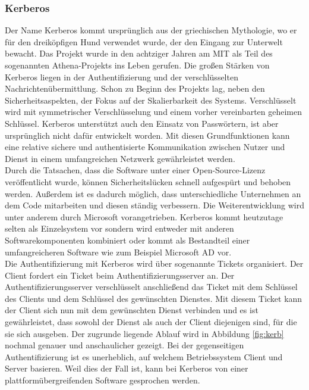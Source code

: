 \documentclass[
book,
a4paper,   
titlepage,  
halfparskip,
12pt        
]{scrartcl}
\begin{document}
\begin{onehalfspacing}
\subsubsection{Kerberos}
Der Name Kerberos kommt ursprünglich aus der griechischen Mythologie, wo er für den dreiköpfigen Hund verwendet wurde, der den Eingang zur Unterwelt bewacht. 
Das Projekt wurde in den achtziger Jahren am \ac{MIT} als Teil des sogenannten Athena-Projekts ins Leben gerufen\cite{athena}. Die großen Stärken von Kerberos liegen in der Authentifizierung und der verschlüsselten Nachrichtenübermittlung. Schon zu Beginn des Projekts lag, neben den Sicherheitsaspekten, der Fokus auf der Skalierbarkeit des Systems. 
Verschlüsselt wird mit symmetrischer Verschlüsselung und einem vorher vereinbarten geheimen Schlüssel. Kerberos unterstützt auch den Einsatz von Passwörtern, ist aber ursprünglich nicht dafür entwickelt worden. 
Mit diesen Grundfunktionen kann eine relative sichere und authentisierte Kommunikation zwischen Nutzer und Dienst in einem umfangreichen Netzwerk gewährleistet werden.\cite[S. 137]{kerberos2}\\
Durch die Tatsachen, dass die Software unter einer Open-Source-Lizenz veröffentlicht wurde, können Sicherheitslücken schnell aufgespürt und behoben werden. Außerdem ist es dadurch möglich, dass unterschiedliche Unternehmen an dem Code mitarbeiten und diesen ständig verbessern. Die Weiterentwicklung wird unter anderem durch Microsoft vorangetrieben. Kerberos kommt heutzutage selten als Einzelsystem vor sondern wird entweder mit anderen Softwarekomponenten kombiniert oder kommt als Bestandteil einer umfangreicheren Software wie zum Beispiel Microsoft \ac{AD} vor.\cite[S. 138]{kerberos2}\\
Die Authentifizierung mit Kerberos wird über sogenannte Tickets organisiert. Der Client fordert ein Ticket beim Authentifizierungsserver an. Der Authentifizierungsserver verschlüsselt anschließend das Ticket mit dem Schlüssel des Clients und dem Schlüssel des gewünschten Dienstes. Mit diesem Ticket kann der Client sich nun mit dem gewünschten Dienst verbinden und es ist gewährleistet, dass sowohl der Dienst als auch der Client diejenigen sind, für die sie sich ausgeben.  Der zugrunde liegende Ablauf wird in Abbildung \vref{fig:kerb} nochmal genauer und anschaulicher gezeigt. Bei der gegenseitigen Authentifizierung ist es unerheblich, auf welchem Betriebssystem Client und Server basieren. Weil dies der Fall ist, kann bei Kerberos von einer plattformübergreifenden Software gesprochen werden.
\begin{figure}[h]

\end{figure}
\end{onehalfspacing}
\end{document}
